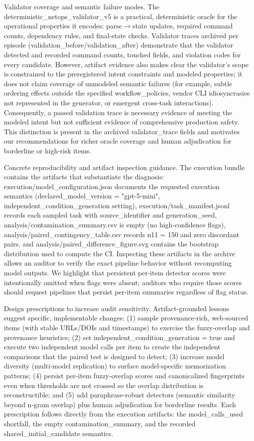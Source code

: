 \documentclass[conference]{IEEEtran}
\begin{document}
Validator coverage and semantic failure modes. The deterministic\_netops\_validator\_v5 is a practical, deterministic oracle for the operational properties it encodes: parse\ensuremath{\rightarrow}state updates, required command counts, dependency rules, and final‑state checks. Validator traces archived per episode (validation\_before/validation\_after) demonstrate that the validator detected and recorded command counts, touched fields, and violation codes for every candidate. However, artifact evidence also makes clear the validator's scope is constrained to the preregistered intent constraints and modeled properties; it does not claim coverage of unmodeled semantic failures (for example, subtle ordering effects outside the specified workflow\_policies, vendor CLI idiosyncrasies not represented in the generator, or emergent cross‑task interactions). Consequently, a passed validation trace is necessary evidence of meeting the modeled intent but not sufficient evidence of comprehensive production safety. This distinction is present in the archived validator\_trace fields and motivates our recommendations for richer oracle coverage and human adjudication for borderline or high‑risk items.

Concrete reproducibility and artifact inspection guidance. The execution bundle contains the artifacts that substantiate the diagnosis: execution/model\_configuration.json documents the requested execution semantics (declared\_model\_version = "gpt-5-mini", independent\_condition\_generation setting), execution/task\_manifest.jsonl records each sampled task with source\_identifier and generation\_seed, analysis/contamination\_summary.csv is empty (no high‑confidence flags), analysis/paired\_contingency\_table.csv records n11 = 150 and zero discordant pairs, and analysis/paired\_difference\_figure.svg contains the bootstrap distribution used to compute the CI. Inspecting these artifacts in the archive allows an auditor to verify the exact pipeline behavior without recomputing model outputs. We highlight that persistent per‑item detector scores were intentionally omitted when flags were absent; auditors who require those scores should request pipelines that persist per‑item summaries regardless of flag status.

Design prescriptions to increase audit sensitivity. Artifact‑grounded lessons suggest specific, implementable changes: (1) sample provenance‑rich, web‑sourced items (with stable URLs/DOIs and timestamps) to exercise the fuzzy‑overlap and provenance heuristics; (2) set independent\_condition\_generation = true and execute two independent model calls per item to create the independent comparisons that the paired test is designed to detect; (3) increase model diversity (multi‑model replication) to surface model‑specific memorization patterns; (4) persist per‑item fuzzy‑overlap scores and canonicalized fingerprints even when thresholds are not crossed so the overlap distribution is reconstructible; and (5) add paraphrase‑robust detectors (semantic similarity beyond n‑gram overlap) plus human adjudication for borderline results. Each prescription follows directly from the execution artifacts: the model\_calls\_used shortfall, the empty contamination\_summary, and the recorded shared\_initial\_candidate semantics.
\end{document}
